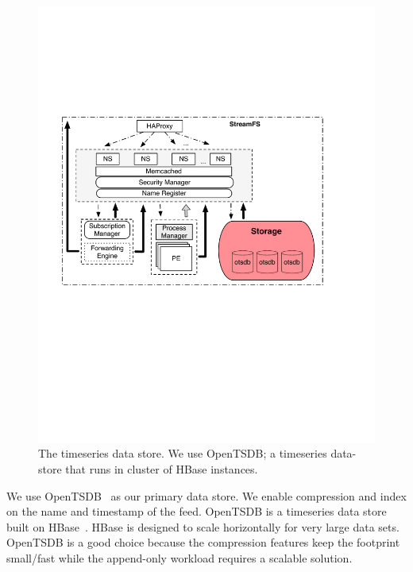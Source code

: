 \begin{figure}[h!] %
\centering
\includegraphics[width=.55\columnwidth]{figs/tsdstore}
\caption{The timeseries data store.  We use OpenTSDB; a timeseries data-store that runs in cluster of
HBase instances.}
\label{fig:tsdb}
\end{figure}

We use OpenTSDB~\cite{opentsdb} as our primary data store. We enable compression  and index on the name and timestamp 
of the feed.  OpenTSDB is a timeseries data store built on HBase~\cite{HBase}.  HBase is designed to scale horizontally for very
large data sets.  OpenTSDB is a good choice because the compression features keep the footprint small/fast while the append-only 
workload requires a scalable solution.
